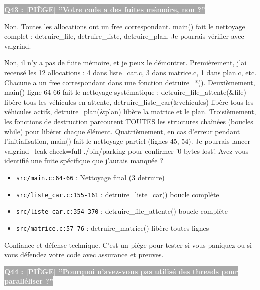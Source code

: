 \documentclass[12pt,a4paper]{article}
\newcommand{\question}[1]{%
    \vspace{0.5cm}
    \noindent\colorbox{darkgray}{\textcolor{white}{\textbf{#1}}}
    \vspace{0.3cm}
}
\begin{document}
\question{Q43 : [PIÈGE] ''Votre code a des fuites mémoire, non ?''}

\begin{reponse_courte}
Non. Toutes les allocations ont un free correspondant. main() fait le nettoyage complet : detruire\_file, detruire\_liste, detruire\_plan. Je pourrais vérifier avec valgrind.
\end{reponse_courte}

\begin{reponse_longue}
Non, il n'y a pas de fuite mémoire, et je peux le démontrer. Premièrement, j'ai recensé les 12 allocations : 4 dans liste\_car.c, 3 dans matrice.c, 1 dans plan.c, etc. Chacune a un free correspondant dans une fonction detruire\_*(). Deuxièmement, main() ligne 64-66 fait le nettoyage systématique : detruire\_file\_attente(\&file) libère tous les véhicules en attente, detruire\_liste\_car(\&vehicules) libère tous les véhicules actifs, detruire\_plan(\&plan) libère la matrice et le plan. Troisièmement, les fonctions de destruction parcourent TOUTES les structures chaînées (boucles while) pour libérer chaque élément. Quatrièmement, en cas d'erreur pendant l'initialisation, main() fait le nettoyage partiel (lignes 45, 54). Je pourrais lancer valgrind --leak-check=full ./bin/parking pour confirmer '0 bytes lost'. Avez-vous identifié une fuite spécifique que j'aurais manquée ?
\end{reponse_longue}

\begin{reference_code}
\begin{itemize}
    \item \texttt{src/main.c:64-66} : Nettoyage final (3 detruire)
    \item \texttt{src/liste\_car.c:155-161} : detruire\_liste\_car() boucle complète
    \item \texttt{src/liste\_car.c:354-370} : detruire\_file\_attente() boucle complète
    \item \texttt{src/matrice.c:57-76} : detruire\_matrice() libère toutes lignes
\end{itemize}
\end{reference_code}

\begin{objectif_prof}
Confiance et défense technique. C'est un piège pour tester si vous paniquez ou si vous défendez votre code avec assurance et preuves.
\end{objectif_prof}

\question{Q44 : [PIÈGE] ''Pourquoi n'avez-vous pas utilisé des threads pour paralléliser ?''}
\end{document}
